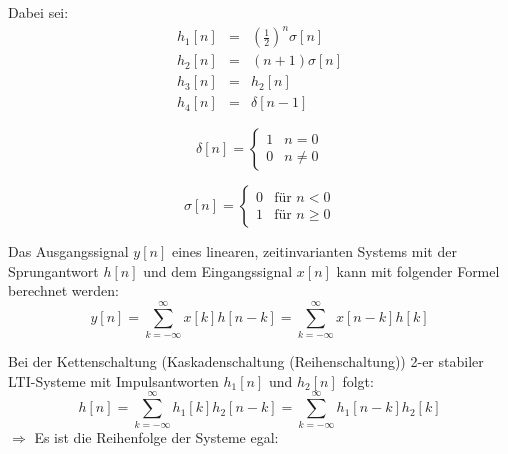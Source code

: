 \begin{uebsp}
\begin{Exercise}
\begin{center}
\end{center}
Dabei sei:
\begin{eqnarray*}
    h_1[n]&=&\left(\frac{1}{2}\right)^n\sigma[n]\\
    h_2[n]&=&(n+1)\sigma[n]\\
    h_3[n]&=&h_2[n]\\
    h_4[n]&=&\delta[n-1]
\end{eqnarray*}
\end{Exercise}
\begin{Answer}
    \begin{definition}
        \[\delta[n]=\begin{cases}1 & n=0\\0 & n\neq 0\end{cases}\]
    \end{definition}
    \begin{definition}
        \[\sigma[n]=\begin{cases}0 & \text{für }n<0\\1& \text{für }n\geq 0\end{cases}\]
    \end{definition}
    \begin{uebsp_theory}
        Das Ausgangssignal $y[n]$ eines linearen, zeitinvarianten Systems mit der Sprungantwort $h[n]$ und dem Eingangssignal $x[n]$ kann mit folgender Formel berechnet werden:
        \[y[n]=\sum_{k=-\infty}^\infty x[k]h[n-k]=\sum_{k=-\infty}^\infty x[n-k]h[k]\]
    \end{uebsp_theory}
    \begin{uebsp_theory}
        Bei der Kettenschaltung (Kaskadenschaltung (Reihenschaltung)) 2-er 
        stabiler LTI-Systeme mit Impulsantworten $h_1[n]$ und $h_2[n]$ folgt:
        \[h[n]=\sum_{k=-\infty}^\infty h_1[k]h_2[n-k]=\sum_{k=-\infty}^\infty h_1[n-k]h_2[k]\]
        $\Rightarrow$ Es ist die Reihenfolge der Systeme egal:
        \begin{center}
\end{center}
\end{uebsp_theory}
\end{Answer}
\end{uebsp}
